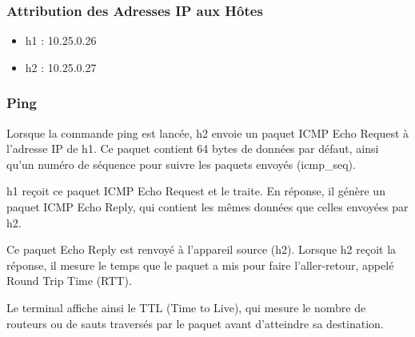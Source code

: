 \subsubsection{Attribution des Adresses IP aux Hôtes}
\begin{itemize}
    \item h1 : 10.25.0.26
    \item h2 : 10.25.0.27
\end{itemize}


\subsubsection{Ping}
Lorsque la commande ping est lancée, h2 envoie un paquet ICMP Echo Request à l'adresse IP de h1. Ce paquet contient 64 bytes de données par défaut, ainsi qu'un numéro de séquence pour suivre les paquets envoyés (icmp\_seq).

h1 reçoit ce paquet ICMP Echo Request et le traite. En réponse, il génère un paquet ICMP Echo Reply, qui contient les mêmes données que celles envoyées par h2.

Ce paquet Echo Reply est renvoyé à l'appareil source (h2). Lorsque h2 reçoit la réponse, il mesure le temps que le paquet a mis pour faire l'aller-retour, appelé Round Trip Time (RTT).

Le terminal affiche ainsi le TTL (Time to Live), qui mesure le nombre de routeurs ou de sauts traversés par le paquet avant d'atteindre sa destination.

